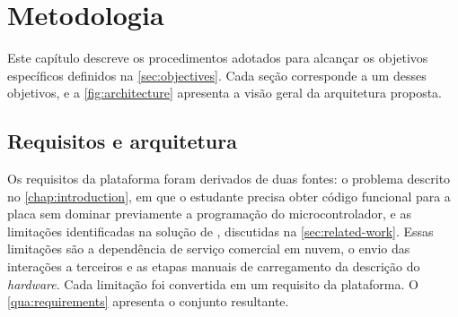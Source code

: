 
\chapter{Metodologia}
\label{chap:methodology}

Este capítulo descreve os procedimentos adotados para alcançar os objetivos específicos definidos na \autoref{sec:objectives}. Cada seção corresponde a um desses objetivos, e a \autoref{fig:architecture} apresenta a visão geral da arquitetura proposta.

\section{Requisitos e arquitetura}
\label{sec:method-architecture}

Os requisitos da plataforma foram derivados de duas fontes: o problema descrito no \autoref{chap:introduction}, em que o estudante precisa obter código funcional para a placa sem dominar previamente a programação do microcontrolador, e as limitações identificadas na solução de , discutidas na \autoref{sec:related-work}. Essas limitações são a dependência de serviço comercial em nuvem, o envio das interações a terceiros e as etapas manuais de carregamento da descrição do \textit{hardware}. Cada limitação foi convertida em um requisito da plataforma. O \autoref{qua:requirements} apresenta o conjunto resultante.

